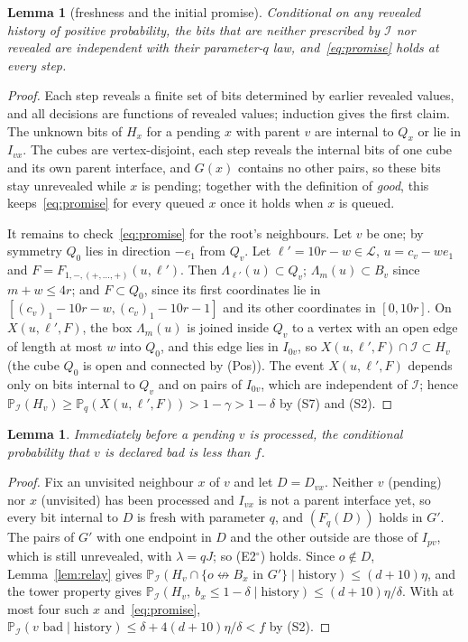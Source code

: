 \documentclass[11pt]{article}
\newtheorem{lemma}[theorem]{Lemma}
\theoremstyle{definition}
\theoremstyle{remark}
\numberwithin{equation}{section}
\newcommand{\Pp}{\mathbb P}
\newcommand{\1}{\mathbf 1}
\newcommand{\cI}{\mathcal I}
\newcommand{\cL}{\mathcal L}
\newcommand{\nlr}{\mathrel{\not\leftrightarrow}}
\newcommand{\Lam}{\Lambda}
\begin{document}
\begin{lemma}[freshness and the initial promise]\label{lem:fresh}
Conditional on any revealed history of positive probability, the bits that are neither prescribed
by $\cI$ nor revealed are independent with their parameter-$q$ law, and~\eqref{eq:promise} holds at
every step.
\end{lemma}
\begin{proof}
Each step reveals a finite set of bits determined by earlier revealed values, and all decisions are
functions of revealed values; induction gives the first claim. The unknown bits of $H_x$ for a
pending $x$ with parent $v$ are internal to $Q_x$ or lie in $I_{vx}$. The cubes are vertex-disjoint,
each step reveals the internal bits of one cube and its own parent interface, and $G(x)$ contains no
other pairs, so these bits stay unrevealed while $x$ is pending; together with the definition of
\emph{good}, this keeps~\eqref{eq:promise} for every queued $x$ once it holds when $x$ is queued.

It remains to check~\eqref{eq:promise} for the root's neighbours. Let $v$ be one; by symmetry $Q_0$
lies in direction $-e_1$ from $Q_v$. Let $\ell'=10r-w\in\cL$, $u=c_v-we_1$ and
$F=F_{1,-,(+,\dots,+)}(u,\ell')$. Then $\Lam_{\ell'}(u)\subset Q_v$; $\Lam_m(u)\subset B_v$ since
$m+w\le4r$; and $F\subset Q_0$, since its first coordinates lie in $[(c_v)_1-10r-w,(c_v)_1-10r-1]$
and its other coordinates in $[0,10r]$. On $X(u,\ell',F)$, the box $\Lam_m(u)$ is joined inside $Q_v$
to a vertex with an open edge of length at most $w$ into $Q_0$, and this edge lies in $I_{0v}$, so
$X(u,\ell',F)\cap\cI\subset H_v$ (the cube $Q_0$ is open and connected by (Pos)). The event
$X(u,\ell',F)$ depends only on bits internal to $Q_v$ and on pairs of $I_{0v}$, which are independent
of $\cI$; hence $\Pp_\cI(H_v)\ge\Pp_q(X(u,\ell',F))>1-\gamma>1-\delta$ by (S7) and (S2).
\end{proof}

\begin{lemma}\label{lem:bad}
Immediately before a pending $v$ is processed, the conditional probability that $v$ is declared bad
is less than $f$.
\end{lemma}
\begin{proof}
Fix an unvisited neighbour $x$ of $v$ and let $D=D_{vx}$. Neither $v$ (pending) nor $x$ (unvisited)
has been processed and $I_{vx}$ is not a parent interface yet, so every bit internal to $D$ is fresh
with parameter $q$, and $(F_q(D))$ holds in $G'$. The pairs of $G'$ with one endpoint in $D$ and the
other outside are those of $I_{pv}$, which is still unrevealed, with $\lambda=qJ$; so (E2$^\circ$)
holds. Since $o\notin D$, Lemma~\ref{lem:relay} gives
$\Pp_\cI(H_v\cap\{o\nlr B_x\text{ in }G'\}\mid\text{history})\le(d+10)\eta$, and the tower property
gives $\Pp_\cI(H_v,\ b_x\le1-\delta\mid\text{history})\le(d+10)\eta/\delta$. With at most four such
$x$ and~\eqref{eq:promise}, $\Pp_\cI(v\text{ bad}\mid\text{history})\le\delta+4(d+10)\eta/\delta<f$
by (S2).
\end{proof}
\end{document}
